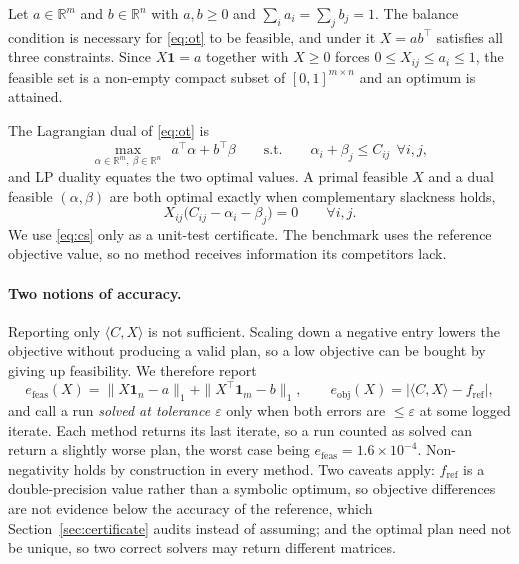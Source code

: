 \documentclass{article}
\newcommand{\R}{\mathbb{R}}
\newcommand{\eFeas}{e_{\mathrm{feas}}}
\newcommand{\eObj}{e_{\mathrm{obj}}}
\newcommand{\Tol}[1]{10^{-#1}}
\begin{document}
Let $a\in\R^m$ and $b\in\R^n$ with $a,b\ge0$ and $\sum_i a_i=\sum_j b_j=1$. The balance
condition is necessary for \eqref{eq:ot} to be feasible, and under it $X=ab^\top$
satisfies all three constraints. Since $X\mathbf 1=a$ together with $X\ge0$ forces
$0\le X_{ij}\le a_i\le1$, the feasible set is a non-empty compact subset of
$[0,1]^{m\times n}$ and an optimum is attained.

The Lagrangian dual of \eqref{eq:ot} is
\begin{equation}
\label{eq:dual}
\max_{\alpha\in\R^m,\ \beta\in\R^n}\ \ a^\top\alpha+b^\top\beta
\qquad\text{s.t.}\qquad
\alpha_i+\beta_j\le C_{ij}\ \ \forall i,j ,
\end{equation}
and LP duality equates the two optimal values. A primal feasible $X$ and a dual feasible
$(\alpha,\beta)$ are both optimal exactly when complementary slackness holds,
\begin{equation}
\label{eq:cs}
X_{ij}\bigl(C_{ij}-\alpha_i-\beta_j\bigr)=0 \qquad \forall i,j .
\end{equation}
We use \eqref{eq:cs} only as a unit-test certificate. The benchmark uses the reference
objective value, so no method receives information its competitors lack.

\paragraph{Two notions of accuracy.}
Reporting only $\langle C,X\rangle$ is not sufficient. Scaling down a negative entry
lowers the objective without producing a valid plan, so a low objective can be bought by
giving up feasibility. We therefore report
\begin{equation}
\eFeas(X)=\|X\mathbf 1_n-a\|_1+\|X^\top\mathbf1_m-b\|_1,
\qquad
\eObj(X)=\bigl|\langle C,X\rangle-f_{\mathrm{ref}}\bigr| ,
\end{equation}
and call a run \emph{solved at tolerance $\varepsilon$} only when both errors are
$\le\varepsilon$ at some logged iterate. Each method returns its last iterate, so a run
counted as solved can return a slightly worse plan, the worst case being
$\eFeas=1.6\times\Tol{4}$. Non-negativity holds by construction in every method. Two
caveats apply: $f_{\mathrm{ref}}$ is a double-precision value rather than a symbolic
optimum, so objective differences are not evidence below the accuracy of the reference,
which Section~\ref{sec:certificate} audits instead of assuming; and the optimal plan need
not be unique, so two correct solvers may return different matrices.
\end{document}
